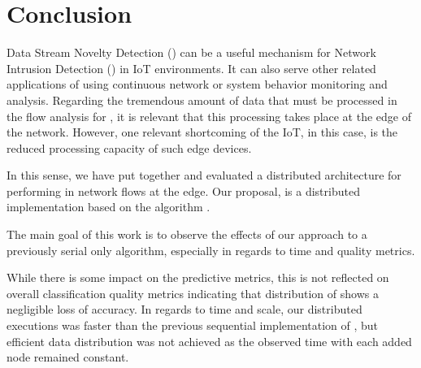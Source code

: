 
\section{Conclusion} 
\label{sec:conclusion}


Data Stream Novelty Detection (\nd) can be a useful mechanism for Network
Intrusion Detection (\nids) in IoT environments. It can also serve other related applications of \nd using continuous
network or system behavior monitoring and analysis.
Regarding the tremendous amount of data that must be processed in the flow analysis for \nd, it 
is relevant that this processing takes place at the edge of the network. 
However, one relevant shortcoming of the IoT, in this case, is the reduced processing capacity of such edge devices. 

In this sense, we have put together and evaluated a distributed architecture for performing \nd in network flows at the edge.
Our proposal, \mfog is a distributed \nd
implementation based on the \nd algorithm \minas.

The main goal of this work is to observe the effects of our approach to a
previously serial only algorithm, especially in regards to time and quality
metrics.


While there is some impact on the predictive metrics, this is not reflected on
overall classification quality metrics indicating that distribution of \minas
shows a negligible loss of accuracy.
In regards to time and scale, our distributed executions was faster than the 
previous sequential implementation of \minas, but efficient data distribution was not achieved as the
observed time with each added node remained constant.

